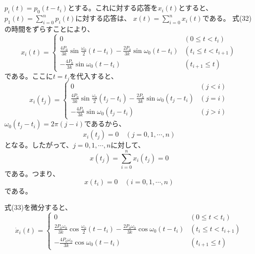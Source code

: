 \documentclass[a4paper]{jsarticle}
\begin{document}
\subsection{}
$p_i(t) = p_0(t - t_i)$とする。これに対する応答を$x_i(t)$とすると、
$p_1(t) = \sum_{i = 0}^n p_i(t)$に対する応答は、
$x(t) = \sum_{i = 0}^n x_i(t)$である。
式(32)の時間をずらすことにより、
\begin{equation}
  x_i(t) =
  \begin{cases}
    0 & (0 \leq t < t_i) \\
    \frac{4 P_0}{3k} \sin \frac{\omega_0}{2} (t - t_i)
    - \frac{2 P_0}{3k} \sin \omega_0 (t - t_i) &
    (t_i \leq t < t_{i+1}) \\
    -\frac{4 P_0}{3 k} \sin \omega_0 (t - t_i) &
    (t_{i+1} \leq t)
  \end{cases}
\end{equation}
である。ここに$t = t_j$を代入すると、
\begin{equation}
  x_i(t_j) =
  \begin{cases}
    0 & (j < i) \\
    \frac{4 P_0}{3k} \sin \frac{\omega_0}{2} (t_j - t_i)
    - \frac{2 P_0}{3k} \sin \omega_0 (t_j - t_i) &
    (j = i) \\
    -\frac{4 P_0}{3 k} \sin \omega_0 (t_j - t_i) &
    (j > i)
  \end{cases}
\end{equation}
$\omega_0 (t_j - t_i) = 2 \pi (j - i)$であるから、
\begin{equation}
  x_i(t_j) = 0 \quad (j = 0, 1, \cdots, n)
\end{equation}
となる。したがって、$j = 0, 1, \cdots ,n$に対して、
\begin{equation}
  x(t_j) = \sum_{i = 0}^n x_i(t_j) = 0
\end{equation}
である。つまり、
\begin{equation}
  x(t_i) = 0 \quad (i = 0, 1, \cdots ,n)
\end{equation}
である。\par
式(33)を微分すると、
\begin{equation}
  \dot{x}_i(t) =
  \begin{cases}
    0 & (0 \leq t < t_i) \\
    \frac{2 P_0 \omega_0}{3k} \cos \frac{\omega_0}{2} (t - t_i)
    - \frac{2 P_0 \omega_0}{3k} \cos \omega_0 (t - t_i) &
    (t_i \leq t < t_{i+1}) \\
    -\frac{4 P_0 \omega_0}{3 k} \cos \omega_0 (t - t_i) &
    (t_{i+1} \leq t)
  \end{cases}
\end{equation}
\end{document}
